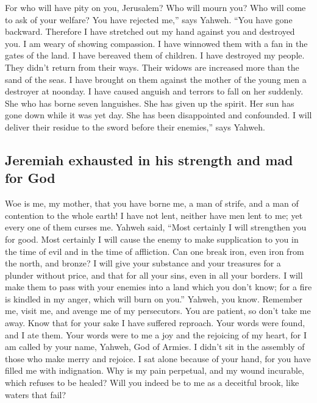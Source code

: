  For who will have pity on you, Jerusalem? Who will mourn
you? Who will come to ask of your welfare?  You have
rejected me,'' says Yahweh. ``You have gone backward. Therefore I have
stretched out my hand against you and destroyed you. I am weary of
showing compassion.  I have winnowed them with a fan in
the gates of the land. I have bereaved them of children. I have
destroyed my people. They didn't return from their ways. 
Their widows are increased more than the sand of the seas. I have
brought on them against the mother of the young men a destroyer at
noonday. I have caused anguish and terrors to fall on her suddenly.
 She who has borne seven languishes. She has given up the
spirit. Her sun has gone down while it was yet day. She has been
disappointed and confounded. I will deliver their residue to the sword
before their enemies,'' says Yahweh.

\hypertarget{jeremiah-exhausted-in-his-strength-and-mad-for-god}{%
\subsection{Jeremiah exhausted in his strength and mad for
God}\label{jeremiah-exhausted-in-his-strength-and-mad-for-god}}

 Woe is me, my mother, that you have borne me, a man of
strife, and a man of contention to the whole earth! I have not lent,
neither have men lent to me; yet every one of them curses me.
 Yahweh said, ``Most certainly I will strengthen you for
good. Most certainly I will cause the enemy to make supplication to you
in the time of evil and in the time of affliction.  Can
one break iron, even iron from the north, and bronze?  I
will give your substance and your treasures for a plunder without price,
and that for all your sins, even in all your borders.  I
will make them to pass with your enemies into a land which you don't
know; for a fire is kindled in my anger, which will burn on you.''
 Yahweh, you know. Remember me, visit me, and avenge me
of my persecutors. You are patient, so don't take me away. Know that for
your sake I have suffered reproach.  Your words were
found, and I ate them. Your words were to me a joy and the rejoicing of
my heart, for I am called by your name, Yahweh, God of Armies.
 I didn't sit in the assembly of those who make merry and
rejoice. I sat alone because of your hand, for you have filled me with
indignation.  Why is my pain perpetual, and my wound
incurable, which refuses to be healed? Will you indeed be to me as a
deceitful brook, like waters that fail?

